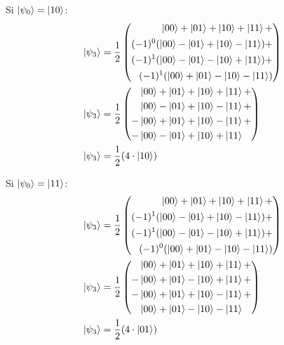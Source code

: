 \documentclass{article}
\begin{document}
Si $\ket{\psi_0} = \ket{10}$:
\begin{align*}
    \ket{\psi_3} &= \frac{1}{2}\left(
        \begin{aligned}
            \ket{00} + \ket{01} + \ket{10} + \ket{11} + \\
            (-1)^0(\ket{00} - \ket{01} + \ket{10} - \ket{11}) + \\
            (-1)^1(\ket{00} - \ket{01} - \ket{10} + \ket{11}) + \\
            (-1)^1(\ket{00} + \ket{01} - \ket{10} - \ket{11}) \\
        \end{aligned}
    \right) \\
    \ket{\psi_3} &= \frac{1}{2}\left(
        \begin{aligned}
            &\ket{00} + \ket{01} + \ket{10} + \ket{11} + \\
            &\ket{00} - \ket{01} + \ket{10} - \ket{11} + \\
            -&\ket{00} + \ket{01} + \ket{10} - \ket{11} + \\
            -&\ket{00} - \ket{01} + \ket{10} + \ket{11} \\
        \end{aligned}
    \right) \\
    \ket{\psi_3} &= \frac{1}{2}(4\cdot\ket{10})
\end{align*}

Si $\ket{\psi_0} = \ket{11}$:
\begin{align*}
    \ket{\psi_3} &= \frac{1}{2}\left(
        \begin{aligned}
            \ket{00} + \ket{01} + \ket{10} + \ket{11} + \\
            (-1)^1(\ket{00} - \ket{01} + \ket{10} - \ket{11}) + \\
            (-1)^1(\ket{00} - \ket{01} - \ket{10} + \ket{11}) + \\
            (-1)^0(\ket{00} + \ket{01} - \ket{10} - \ket{11}) \\
        \end{aligned}
    \right) \\
    \ket{\psi_3} &= \frac{1}{2}\left(
        \begin{aligned}
            &\ket{00} + \ket{01} + \ket{10} + \ket{11} + \\
            -&\ket{00} + \ket{01} - \ket{10} + \ket{11} + \\
            -&\ket{00} + \ket{01} + \ket{10} - \ket{11} + \\
            &\ket{00} + \ket{01} - \ket{10} - \ket{11} \\
        \end{aligned}
    \right) \\
    \ket{\psi_3} &= \frac{1}{2}(4\cdot\ket{01})
\end{align*}
\end{document}
